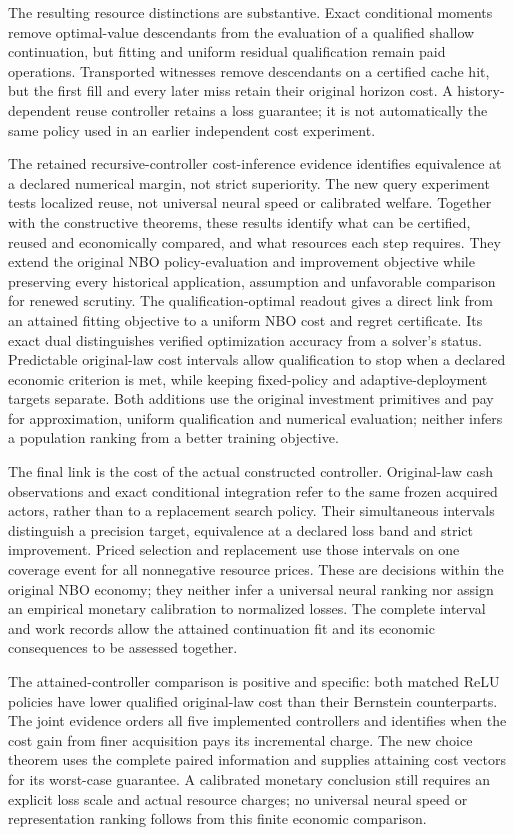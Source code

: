 \documentclass[ecta,nameyear,draft]{econsocart}
\begin{document}
The resulting resource distinctions are substantive. Exact conditional moments remove optimal-value descendants from the evaluation of a qualified shallow continuation, but fitting and uniform residual qualification remain paid operations. Transported witnesses remove descendants on a certified cache hit, but the first fill and every later miss retain their original horizon cost. A history-dependent reuse controller retains a loss guarantee; it is not automatically the same policy used in an earlier independent cost experiment.

The retained recursive-controller cost-inference evidence identifies equivalence at a declared numerical margin, not strict superiority. The new query experiment tests localized reuse, not universal neural speed or calibrated welfare. Together with the constructive theorems, these results identify what can be certified, reused and economically compared, and what resources each step requires. They extend the original NBO policy-evaluation and improvement objective while preserving every historical application, assumption and unfavorable comparison for renewed scrutiny.
The qualification-optimal readout gives a direct link from an attained fitting objective to a uniform NBO cost and regret certificate. Its exact dual distinguishes verified optimization accuracy from a solver's status. Predictable original-law cost intervals allow qualification to stop when a declared economic criterion is met, while keeping fixed-policy and adaptive-deployment targets separate. Both additions use the original investment primitives and pay for approximation, uniform qualification and numerical evaluation; neither infers a population ranking from a better training objective.

The final link is the cost of the actual constructed controller. Original-law cash observations and exact conditional integration refer to the same frozen acquired actors, rather than to a replacement search policy. Their simultaneous intervals distinguish a precision target, equivalence at a declared loss band and strict improvement. Priced selection and replacement use those intervals on one coverage event for all nonnegative resource prices. These are decisions within the original NBO economy; they neither infer a universal neural ranking nor assign an empirical monetary calibration to normalized losses. The complete interval and work records allow the attained continuation fit and its economic consequences to be assessed together.

The attained-controller comparison is positive and specific: both matched ReLU policies have lower qualified original-law cost than their Bernstein counterparts. The joint evidence orders all five implemented controllers and identifies when the cost gain from finer acquisition pays its incremental charge. The new choice theorem uses the complete paired information and supplies attaining cost vectors for its worst-case guarantee. A calibrated monetary conclusion still requires an explicit loss scale and actual resource charges; no universal neural speed or representation ranking follows from this finite economic comparison.



\end{document}
